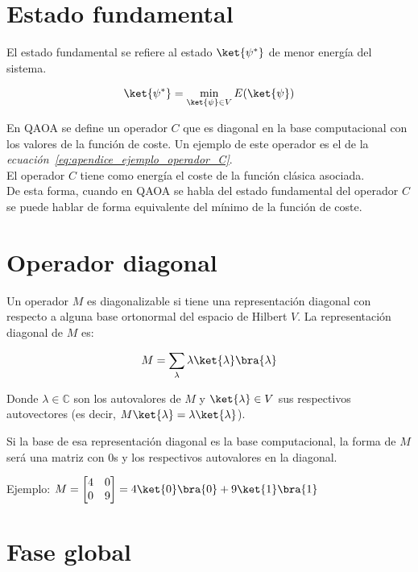 \section{Estado fundamental\label{sec:8-concepto-estado_fundamental}}

El estado fundamental se refiere al estado $\ket{\psi^*}$ de menor energía del sistema.

\begin{align}
  \ket{\psi^*} = \min_{\ket{\psi} \in V} E(\ket{\psi})
\end{align}

En QAOA se define un operador $C$ que es diagonal en la base computacional con los valores de la función de coste.
Un ejemplo de este operador es el de la \textit{ecuación~\ref{eq:apendice_ejemplo_operador_C}}.
\\
El operador $C$ tiene como energía el coste de la función clásica asociada.
\\
De esta forma, cuando en QAOA se habla del estado fundamental del operador $C$ se puede hablar de forma equivalente del mínimo de la función de coste.


\section{Operador diagonal\label{sec:8-concepto-diagonal}}

Un operador $M$ es diagonalizable si tiene una representación diagonal con respecto a alguna base ortonormal del espacio de Hilbert $V$.
La representación diagonal de $M$ es:

\begin{align}
  M = \sum_\lambda \lambda \ket{\lambda} \bra{\lambda}
\end{align}

Donde $\lambda \in \mathbb{C}$ son los autovalores de $M$ y $\ket{\lambda} \in V$ sus respectivos autovectores (es decir, $M \ket{\lambda} = \lambda \ket{\lambda}$).

Si la base de esa representación diagonal es la base computacional, la forma de $M$ será una matriz con 0s y los respectivos autovalores en la diagonal.

Ejemplo: $M = \begin{bmatrix}
  4 & 0 \\
  0 & 9
\end{bmatrix} = 4\ket{0} \bra{0} + 9\ket{1} \bra{1}$


\section{Fase global\label{sec:8-concepto-fase_global}}

